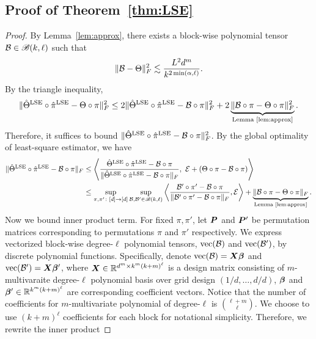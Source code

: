 \documentclass[11pt]{article}
\theoremstyle{definition}
\def\caliB{\mathscr{B}}
\begin{document}
\subsection{Proof of Theorem~\ref{thm:LSE}}\label{sec:proofLSE}
\begin{proof} By Lemma~\ref{lem:approx}, there exists a block-wise polynomial tensor $\tB\in\caliB(k,\ell)$ such that
\begin{equation}\label{eq:approx}
\lVert\mathcal{B}-\Theta\rVert_F^2\lesssim {L^2d^m\over k^{2\min(\alpha,\ell)}}.
\end{equation}
By the triangle inequality,
\begin{equation}\label{eq:tri}
\lVert\hat\Theta^\textup{LSE}\circ\hat\pi^\textup{LSE} -\Theta\circ \pi\rVert_F^2\leq 2\lVert\hat\Theta^\textup{LSE}\circ\hat\pi^\textup{LSE} -\mathcal{B}\circ \pi\rVert_F^2+2\underbrace{\lVert\mathcal{B}\circ \pi-\Theta\circ \pi\rVert_F^2}_{\textup{Lemma~\ref{lem:approx}}}.
\end{equation}
Therefore, it suffices to bound $\lVert\hat\Theta^\textup{LSE}\circ\hat\pi^\textup{LSE} -\mathcal{B}\circ \pi\rVert_F^2$. By the global optimality of least-square estimator, we have
\begin{align}
\FnormSize{}{\hat\Theta^\textup{LSE}\circ\hat\pi^\textup{LSE} -\tB\circ \pi}&\leq \left\langle {\hat \Theta^\textup{LSE}\circ \hat \pi^\textup{LSE}-\tB\circ \pi \over \FnormSize{}{ \hat \Theta^\textup{LSE}\circ \hat \pi^\textup{LSE}-\tB\circ \pi}},\ \tE+(\Theta\circ \pi-\tB\circ \pi) \right \rangle \\
&\leq \sup_{\pi, \pi'\colon[d]\to[d]}\sup_{\tB, \tB'\in \caliB(k,\ell)} \left\langle {\tB'\circ \pi'-\tB\circ \pi \over \FnormSize{}{\tB'\circ \pi'-\tB\circ \pi}}, \tE \right \rangle+\underbrace{\FnormSize{}{\tB\circ \pi-\Theta\circ \pi}}_{\textup{Lemma~\ref{lem:approx}}}.
\end{align}
Now we bound inner product term. For fixed $\pi,\pi'$, let $\bm{P}$ and $\bm{P}'$ be permutation matrices corresponding to permutations $\pi$ and $\pi'$ respectively. 
We express vectorized block-wise degree-$\ell$ polynomial tensors, $\text{vec}(\mathcal{B})$ and $\text{vec}(\mathcal{B}')$, by discrete polynomial functions. Specifically, denote $\text{vec}(\mathcal{B})=\bm X\boldsymbol{\beta}$ and $\text{vec}(\mathcal{B}')=\bm X\boldsymbol{\beta}'$, where $\bm X\in\mathbb{R}^{d^m\times k^m(k+m)^\ell}$ is a design matrix consisting of $m$-multivaraite degree-$\ell$ polynomial basis over grid design $(1/d,\ldots,d/d)$, $\boldsymbol{\beta}$ and $\boldsymbol{\beta}'\in\mathbb{R}^{k^m(k+m)^\ell}$ are corresponding coefficient vectors. Notice that the number of coefficients for $m$-multivariate polynomial of degree-$\ell$ is $\ell+m \choose \ell$. We choose to use $(k+m)^\ell$ coefficients for each block for notational simplicity. Therefore, we rewrite the inner product

\end{proof}
\end{document}
